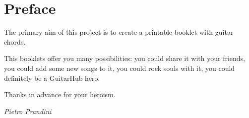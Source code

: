 \section*{Preface}
The primary aim of this project is to create a printable booklet with guitar chords.\par
This booklets offer you many possibilities: you could share it with your friends, you could add some new songs to it,
you could rock souls with it, you could definitely be a GuitarHub hero.\par
Thanks in advance for your heroism.\par
\begin{flushright}
	{\textit{\rmfamily Pietro Prandini}}\par
\end{flushright}
\newpage
